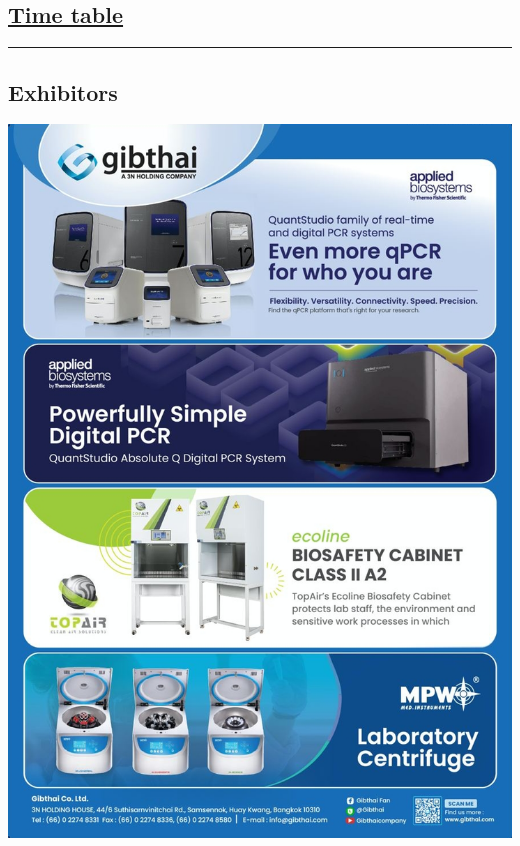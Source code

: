 \documentclass[
]{article}
\begin{document}
\hypertarget{time-table}{%
\subsection{\texorpdfstring{\href{Page/src/Time\%20table/Time_table.html}{Time
table}}{Time table}}\label{time-table}}

\begin{center}\rule{0.5\linewidth}{0.5pt}\end{center}

\hypertarget{exhibitors}{%
\subsection{\texorpdfstring{\textbf{Exhibitors}}{Exhibitors}}\label{exhibitors}}

\href{https://www.gibthai.com/}{\includegraphics{./Page/elements/img/Exhibitors/Gibthai.jpg}}
\end{document}
